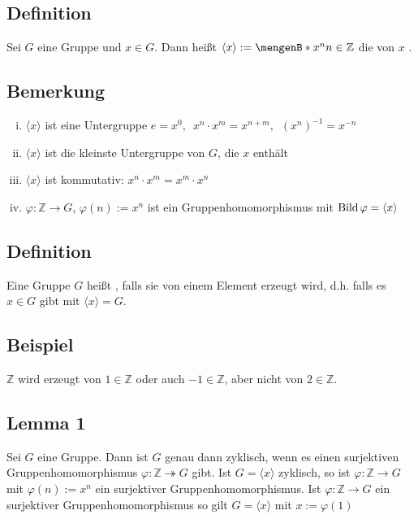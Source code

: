 \subsection[Definition: Von $x$ erzeugte Untergruppe]{Definition} %
\label{sub:21}
Sei $G$ eine Gruppe und $x \in G$. Dann heißt $\langle x \rangle := \set[x^n]{n \in \mathds{Z}} $ die von $x$ .

\subsection[Bemerkung: Eigenschaften der Untergruppe $\langle x\rangle$]{Bemerkung} %
\label{sub:22}
\begin{enumerate}[(i)]
	\item $\langle x\rangle$ ist eine Untergruppe $e=x^0, \enspace x^n \cdot x^m = x^{n+m}, \enspace {(x^n)}^{-1}= x^{-n}$
	\item $\langle x\rangle$ ist die kleinste Untergruppe von $G$, die $x$ enthält
	\item $\langle x\rangle$ ist kommutativ: $x^n \cdot x^m = x^m \cdot  x^n$
	\item $\varphi : \mathds{Z} \to G$, $\varphi(n) := x^n$ ist ein Gruppenhomomorphismus mit $\operatorname{Bild} \varphi = \langle x\rangle$
\end{enumerate}

\subsection[Definition: zyklische Gruppe]{Definition} %
\label{sub:23}
Eine Gruppe $G$ heißt , falls sie von einem Element erzeugt wird, d.h. falls es $x \in G$ gibt mit $\langle x\rangle =G$.

\subsection[Beispiel: Erzeuger von $\mathds{Z}$]{Beispiel} %
\label{sub:24}
$\mathds{Z}$ wird erzeugt von $1 \in \mathds{Z}$ oder auch $-1 \in \mathds{Z}$, aber nicht von $2 \in \mathds{Z}$.

\subsection[Lemma 1: Charakterisierung von zyklisch durch surjektiven Gruppenhomomorphismus]{Lemma 1} %
\label{sub:25}
Sei $G$ eine Gruppe. Dann ist $G$ genau dann zyklisch, wenn es einen surjektiven Gruppenhomomorphismus $\varphi : \mathds{Z} \twoheadrightarrow G$ gibt.
Ist $G=\langle x\rangle$ zyklisch, so ist $\varphi : \mathds{Z} \to G $ mit $\varphi(n) := x^n$ ein surjektiver Gruppenhomomorphismus. Ist $\varphi : \mathds{Z} \to G$ ein surjektiver
Gruppenhomomorphismus so gilt $G = \langle x\rangle$ mit $x := \varphi(1)$

